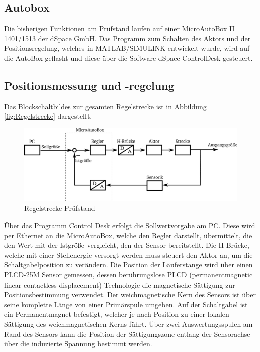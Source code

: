 \subsection{Autobox}

Die bisherigen Funktionen am Prüfstand laufen auf einer MicroAutoBox II 1401/1513 der dSpace GmbH. Das Programm zum Schalten des Aktors und der Positionsregelung, welches in MATLAB/SIMULINK entwickelt wurde, wird auf die AutoBox geflasht und diese über die Software dSpace ControlDesk gesteuert.

\subsection {Positionsmessung und -regelung}\label{regler}

Das Blockschaltbildes zur gesamten Regelstrecke ist in Abbildung \autoref{fig:Regelstrecke} dargestellt.
\begin{figure}[h]
	\centering
		\includegraphics{Bilder/Schaltgabelregelung.pdf}
	\caption{Regelstrecke Prüfstand}
	\label{fig:Regelstrecke}
\end{figure} \noindent
Über das Programm Control Desk erfolgt die Sollwertvorgabe am PC. Diese wird per Ethernet an die MicroAutoBox, welche den Regler darstellt, übermittelt, die den Wert mit der Istgröße vergleicht, den der Sensor bereitstellt. Die H-Brücke, welche mit einer Stellenergie versorgt werden muss steuert den Aktor an, um die Schaltgabelposition zu verändern.
Die Position der Läuferstange wird über einen PLCD-25M Sensor gemessen, dessen berührungslose PLCD (permanentmagnetic linear contactless displacement) Technologie die magnetische Sättigung zur Positionsbestimmung verwendet. Der weichmagnetische Kern des Sensors ist über seine komplette Länge von einer Primärspule umgeben. Auf der Schaltgabel ist ein Permanentmagnet befestigt, welcher je nach Position zu einer lokalen Sättigung des weichmagnetischen Kerns führt. Über zwei Auswertungsspulen am Rand des Sensors kann die Position der Sättigungszone entlang der Sensorachse über die induzierte Spannung bestimmt werden.

